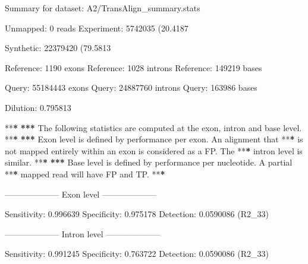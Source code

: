 \documentclass[]{article}
\newenvironment{Shaded}{\begin{snugshade}}{\end{snugshade}}
\newcommand{\DecValTok}[1]{\textcolor[rgb]{0.00,0.00,0.81}{{#1}}}
\newcommand{\FloatTok}[1]{\textcolor[rgb]{0.00,0.00,0.81}{{#1}}}
\newcommand{\StringTok}[1]{\textcolor[rgb]{0.31,0.60,0.02}{{#1}}}
\newcommand{\ErrorTok}[1]{\textbf{{#1}}}
\newcommand{\NormalTok}[1]{{#1}}
\begin{document}
\begin{Shaded}
\begin{Highlighting}[]
\NormalTok{Summary for dataset:}\StringTok{ }\NormalTok{A2/TransAlign_summary.stats}

   \NormalTok{Unmapped:}\StringTok{   }\DecValTok{0} \NormalTok{reads}
   \NormalTok{Experiment:}\StringTok{ }\DecValTok{5742035} \NormalTok{(}\FloatTok{20.4187}\NormalTok{%
   \NormalTok{Synthetic:}\StringTok{  }\DecValTok{22379420} \NormalTok{(}\FloatTok{79.5813}\NormalTok{%

   \NormalTok{Reference:}\StringTok{  }\DecValTok{1190} \NormalTok{exons}
   \NormalTok{Reference:}\StringTok{  }\DecValTok{1028} \NormalTok{introns}
   \NormalTok{Reference:}\StringTok{  }\DecValTok{149219} \NormalTok{bases}

   \NormalTok{Query:}\StringTok{      }\DecValTok{55184443} \NormalTok{exons}
   \NormalTok{Query:}\StringTok{      }\DecValTok{24887760} \NormalTok{introns}
   \NormalTok{Query:}\StringTok{      }\DecValTok{163986} \NormalTok{bases}

   \NormalTok{Dilution:}\StringTok{   }\FloatTok{0.795813}

   \NormalTok{**}\ErrorTok{*}
\StringTok{   }\ErrorTok{***}\StringTok{ }\NormalTok{The following statistics are computed at the exon, intron and base level.}
   \NormalTok{**}\ErrorTok{*}
\StringTok{   }\ErrorTok{***}\StringTok{ }\NormalTok{Exon level is defined by performance per exon. An alignment that}
   \NormalTok{**}\ErrorTok{*}\StringTok{ }\NormalTok{is not mapped entirely within an exon is considered as a FP. The}
   \NormalTok{**}\ErrorTok{*}\StringTok{ }\NormalTok{intron level is similar.}
   \NormalTok{**}\ErrorTok{*}
\StringTok{   }\ErrorTok{***}\StringTok{ }\NormalTok{Base level is defined by performance per nucleotide. A partial}
   \NormalTok{**}\ErrorTok{*}\StringTok{ }\NormalTok{mapped read will have FP and TP.}
   \NormalTok{**}\ErrorTok{*}

\StringTok{   }\NormalTok{--------------------}\StringTok{ }\NormalTok{Exon level --------------------}

\StringTok{   }\NormalTok{Sensitivity:}\StringTok{ }\FloatTok{0.996639}
   \NormalTok{Specificity:}\StringTok{ }\FloatTok{0.975178}
   \NormalTok{Detection:}\StringTok{   }\FloatTok{0.0590086} \NormalTok{(R2_33)}

   \NormalTok{--------------------}\StringTok{ }\NormalTok{Intron level --------------------}

\StringTok{   }\NormalTok{Sensitivity:}\StringTok{ }\FloatTok{0.991245}
   \NormalTok{Specificity:}\StringTok{ }\FloatTok{0.763722}
   \NormalTok{Detection:}\StringTok{   }\FloatTok{0.0590086} \NormalTok{(R2_33)}

}}
\end{Highlighting}
\end{Shaded}
\end{document}
